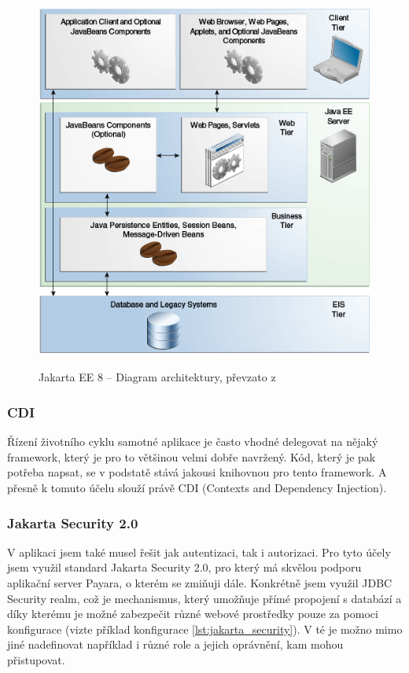 \documentclass[twoside]{ctuthesis}
\theoremstyle{plain}
\theoremstyle{definition}
\theoremstyle{note}
\begin{document}
\begin{figure}[H]
    \caption{Jakarta EE 8 -- Diagram architektury, převzato z \cite{jakarta:tutorial_diagram}}
    \centering
    \includegraphics[width=\textwidth]{images/jakartaeett_dt_004}
    \label{img:jakartaee}
\end{figure}

\subsubsection{CDI}
Řízení životního cyklu samotné aplikace je často vhodné delegovat na nějaký framework, který je pro to většinou velmi dobře navržený. Kód, který je pak potřeba napsat, se v podstatě stává jakousi knihovnou pro tento framework. A přesně k tomuto účelu slouží právě CDI (Contexts and Dependency Injection).

\subsubsection{Jakarta Security 2.0}
V aplikaci jsem také musel řešit jak autentizaci, tak i autorizaci. Pro tyto účely jsem využil standard Jakarta Security 2.0, pro který má skvělou podporu aplikační server Payara, o kterém se zmiňuji dále. Konkrétně jsem využil JDBC Security realm, což je mechanismus, který umožňuje přímé propojení s databází a díky kterému je možné zabezpečit různé webové prostředky pouze za pomoci konfigurace (vizte příklad konfigurace \ref{lst:jakarta_security}). V té je možno mimo jiné nadefinovat například i různé role a jejich oprávnění, kam mohou přistupovat.
\end{document}
